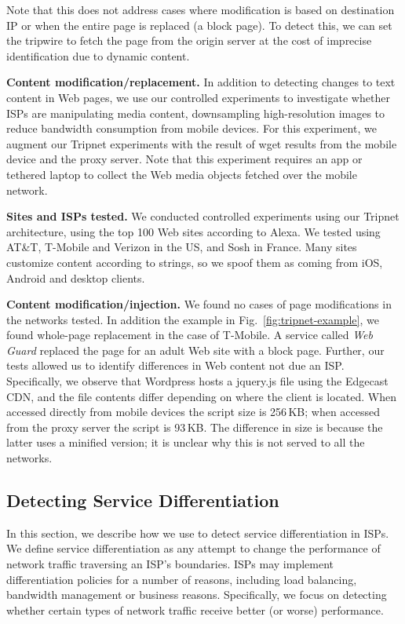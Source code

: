 Note that this does not address cases 
where modification is based on destination IP or when the entire page is replaced (\eg a block page). 
To detect this, we can set the tripwire to fetch the page from the origin server at the cost of imprecise 
identification due to dynamic content.  

\noindent\textbf{Content modification/replacement.}
In addition to detecting changes to text content in 
Web pages, we use our controlled experiments to investigate whether ISPs are manipulating 
media content, \eg downsampling high-resolution images to reduce bandwidth consumption 
from mobile devices. For this experiment, we augment our Tripnet experiments with the result 
of wget results from the mobile device and the proxy server. Note that this experiment requires an 
app or tethered laptop to collect the Web media objects fetched over the mobile network.

\noindent\textbf{Sites and ISPs tested.} We conducted controlled experiments using our Tripnet 
architecture, using the top 100 Web sites according to Alexa. We tested using 
AT\&T, T-Mobile and Verizon in the US, and Sosh in France. 
Many sites customize content according to \useragent strings, so we spoof them  
as coming from iOS, Android and desktop clients.



\noindent\textbf{Content modification/injection.} We found no cases of page modifications in 
the networks tested. In addition the example in Fig.~\ref{fig:tripnet-example}, we found whole-page replacement in the case of T-Mobile. A 
service called \emph{Web Guard} replaced the page for an adult Web site with a block page. 
Further, our tests allowed us to identify differences in Web content not due an ISP. Specifically, 
we observe that Wordpress hosts a jquery.js file using the Edgecast CDN, and the file contents 
differ depending on where the client is located. When accessed directly from mobile devices the 
script size is 256\,KB; when accessed from the proxy server the script is 93\,KB. The difference in 
size is because the latter uses a minified version; it is unclear why this is not served 
to all the networks.

\subsection{Detecting Service Differentiation}

In this section, we describe how we use \meddle to detect service differentiation 
in ISPs. 
%
We define service differentiation as any attempt to change the performance 
of network traffic traversing an ISP's boundaries. ISPs may implement differentiation policies 
for a number of reasons, including load balancing, bandwidth management or business reasons. 
Specifically, we focus on detecting whether certain types of network traffic receive 
better (or worse) performance. 

